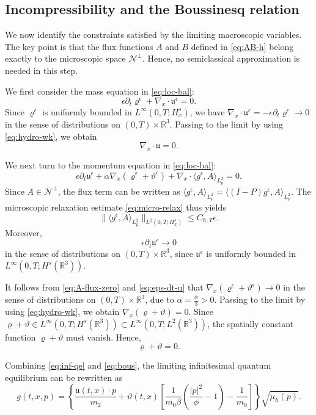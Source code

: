 \documentclass[10pt,reqno]{amsart}
\numberwithin{equation}{section}
\newcommand{\lt}{\left}
\newcommand{\rt}{\right}
\newcommand{\lal}{\langle}
\newcommand{\ral}{\rangle}
\newcommand{\vrh}{\varrho}
\newcommand{\vth}{\vartheta}
\newcommand{\mfu}{\mathfrak{u}}
\newcommand{\R}{\mathbb R}
\newcommand{\bq}{\begin{equation}}
\newcommand{\eq}{\end{equation}}
\newcommand{\pa}{\partial}
\newcommand{\calN}{\mathcal N}
\begin{document}
%
%
%
%
%
%
%
%
%
%
\subsection{Incompressibility and the Boussinesq relation}


We now identify the constraints satisfied by the limiting macroscopic variables. The key point is that the flux functions $A $ and $B $ defined in \eqref{eq:AB-h} belong exactly to the microscopic space $\calN^\perp$. Hence, no semiclassical approximation is needed in this step.

We first consider the mass equation in \eqref{eq:loc-bal}:
\[
\epsilon\pa_t\vrh^\epsilon+\nabla_x\cdot\mfu^\epsilon=0.
\]
Since $\vrh^\epsilon$ is uniformly bounded in $L^\infty(0,T;H^s_x)$, we have $\nabla_x\cdot\mfu^\epsilon=-\epsilon\pa_t\vrh^\epsilon\to 0$ in the sense of distributions on $(0,T)\times\R^3$. Passing to the limit by using \eqref{eq:hydro-wk}, we obtain
\bq\label{eq:inc}
\nabla_x\cdot\mfu=0.
\eq

We next turn to the momentum equation in \eqref{eq:loc-bal}:
\[
\epsilon\pa_t\mfu^\epsilon+\alpha\nabla_x\lt(\vrh^\epsilon+\vth^\epsilon\rt)+\nabla_x\cdot\lal g^\epsilon,A \ral_{L^2_p}=0.
\]
Since $A \in\calN^\perp$, the flux term can be written as $\lal g^\epsilon,A \ral_{L^2_p}=\lal(I-P)g^\epsilon,A \ral_{L^2_p}$. The microscopic relaxation estimate \eqref{eq:micro-relax} thus yields
\bq\label{eq:A-flux-zero}
\|\lal g^\epsilon,A \ral_{L^2_p}\|_{L^2(0,T;H^s_x)}\le C_{\hbar,T}\epsilon.
\eq
Moreover,
\bq\label{eq:eps-dt-u}
\epsilon\pa_t\mfu^\epsilon\to0
\eq
in the sense of distributions on $(0,T)\times\R^3$, since $\mfu^\epsilon$ is uniformly bounded in $L^\infty(0,T;H^s(\R^3))$.

It follows from \eqref{eq:A-flux-zero} and \eqref{eq:eps-dt-u} that $\nabla_x\lt(\vrh^\epsilon+\vth^\epsilon\rt)\to0$ in the sense of distributions on $(0,T)\times\R^3$, due to $\alpha=\frac{\phi }{3}>0$. Passing to the limit by using \eqref{eq:hydro-wk}, we obtain $\nabla_x\lt(\vrh+\vth\rt)=0$. Since $\vrh+\vth\in L^\infty(0,T;H^s(\R^3))\subset L^\infty(0,T;L^2(\R^3))$, the spatially constant function $\vrh+\vth$ must vanish. Hence,
\bq\label{eq:bous}
\vrh+\vth=0.
\eq

Combining \eqref{eq:inf-qe} and \eqref{eq:bous}, the limiting infinitesimal quantum equilibrium can be rewritten as
\[
g(t,x,p)=\lt\{\frac{\mfu(t,x)\cdot p}{m_2 }+\vth(t,x)\lt[\frac{1}{m_0\beta}\lt(\frac{|p|^2}{\phi }-1\rt)-\frac{1}{m_0 }\rt]\rt\}\sqrt{\mu_\hbar(p)}.
\]
%
%
%
%
%
%
%
%
%
%
\end{document}
